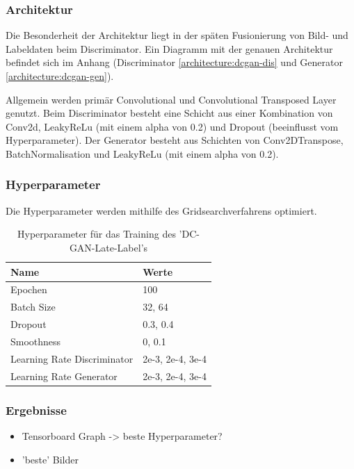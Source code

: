 \subsubsection{Architektur}
Die Besonderheit der Architektur liegt in der späten Fusionierung von Bild- und Labeldaten beim Discriminator.
Ein Diagramm mit der genauen Architektur befindet sich im Anhang (Discriminator \cref{architecture:dcgan-dis} und Generator \cref{architecture:dcgan-gen}).


Allgemein werden primär Convolutional und Convolutional Transposed Layer genutzt.
Beim Discriminator besteht eine Schicht aus einer Kombination von Conv2d, LeakyReLu (mit einem alpha von 0.2) und Dropout (beeinflusst vom Hyperparameter).
Der Generator besteht aus Schichten von Conv2DTranspose, BatchNormalisation und LeakyReLu (mit einem alpha von 0.2).

\subsubsection{Hyperparameter}
Die Hyperparameter werden mithilfe des Gridsearchverfahrens optimiert.
\begin{table}[H]
	\centering
	\begin{tabular}{l l}
		Name                        & Werte            \\ \hline
		Epochen                     & 100              \\
		Batch Size                  & 32, 64            \\
		Dropout                     & 0.3, 0.4         \\
		Smoothness                  & 0, 0.1           \\
		Learning Rate Discriminator & 2e-3, 2e-4, 3e-4 \\
		Learning Rate Generator     & 2e-3, 2e-4, 3e-4
	\end{tabular}
	\caption{Hyperparameter für das Training des 'DC-GAN-Late-Label's}
\end{table}

\subsubsection{Ergebnisse}
\begin{itemize}
	\item Tensorboard Graph -> beste Hyperparameter?
	\item 'beste' Bilder
\end{itemize}

